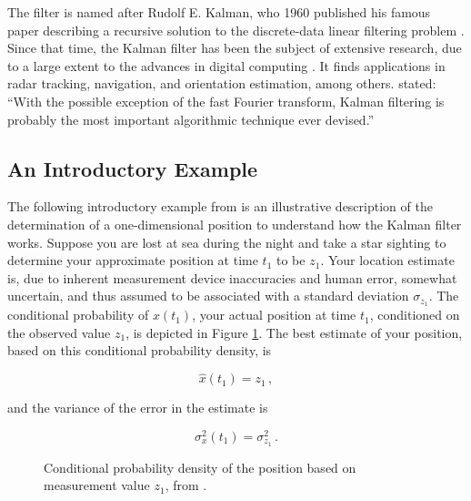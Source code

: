 The filter is named after Rudolf E. Kalman, who 1960 published his famous paper describing a recursive solution to the discrete-data linear filtering problem \cite{kalman_1960}. Since that time, the Kalman filter has been the subject of extensive research, due to a large extent to the advances in digital computing \cite{welch2014}. It finds applications in radar tracking, navigation, and orientation estimation, among others. \citeauthor{zarchan2009fundamentals} \cite{zarchan2009fundamentals} stated: ``With the possible exception of the fast Fourier transform, Kalman filtering is probably the most important algorithmic technique ever devised.''

\subsection{An Introductory Example}

The following introductory example from \citeauthor{Maybeck79} \cite{Maybeck79} is an illustrative description of the determination of a one-dimensional position to understand how the Kalman filter works. Suppose you are lost at sea during the night and take a star sighting to determine your approximate position at time $t_1$ to be $z_1$. Your location estimate is, due to inherent measurement device inaccuracies and human error, somewhat uncertain, and thus assumed to be associated with a standard deviation $\sigma_{z_1}$. The conditional probability of $x(t_1)$, your actual position at time $t_1$, conditioned on the observed value $z_1$, is depicted in Figure \ref{fig:measurement_z1}. The best estimate of your position, based on this conditional probability density, is

\begin{equation}
  \hat{x}(t_1)=z_1\,,
\end{equation}

\noindent
and the variance of the error in the estimate is

\begin{equation}
  \sigma^2_x(t_1)=\sigma^2_{z_1}\,.
\end{equation}

\begin{figure}
\centering
{}
\caption{Conditional probability density of the position based on measurement value $z_1$, from \cite{Maybeck79}.} \label{fig:measurement_z1}
\end{figure}

